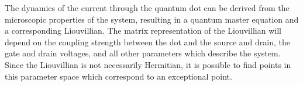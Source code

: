 \documentclass[../main.tex]{subfiles}
\begin{document}
The dynamics of the current through the quantum dot can be derived from the microscopic properties of the system, resulting in a quantum master equation and a corresponding Liouvillian. The matrix representation of the Liouvillian will depend on the coupling strength between the dot and the source and drain, the gate and drain voltages, and all other parameters which describe the system. Since the Liouvillian is not necessarily Hermitian, it is possible to find points in this parameter space which correspond to an exceptional point.
\end{document}
